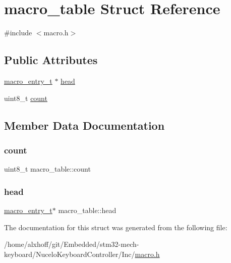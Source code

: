 \hypertarget{structmacro__table}{}\section{macro\+\_\+table Struct Reference}
\label{structmacro__table}


{\ttfamily \#include $<$macro.\+h$>$}

\subsection*{Public Attributes}
\begin{DoxyCompactItemize}
\item 
\hyperlink{macro_8h_af543547a5956dde30bf18b61541fba80}{macro\+\_\+entry\+\_\+t} $\ast$ \hyperlink{structmacro__table_a8609e9945fb75a90068f696b102ce28d}{head}
\item 
uint8\+\_\+t \hyperlink{structmacro__table_aa8c62e6878b8a406f6c8a8043127c65d}{count}
\end{DoxyCompactItemize}


\subsection{Member Data Documentation}
\mbox{\label{structmacro__table_aa8c62e6878b8a406f6c8a8043127c65d}} 
\subsubsection{\texorpdfstring{count}{count}}
{\footnotesize\ttfamily uint8\+\_\+t macro\+\_\+table\+::count}

\mbox{\label{structmacro__table_a8609e9945fb75a90068f696b102ce28d}} 
\subsubsection{\texorpdfstring{head}{head}}
{\footnotesize\ttfamily \hyperlink{macro_8h_af543547a5956dde30bf18b61541fba80}{macro\+\_\+entry\+\_\+t}$\ast$ macro\+\_\+table\+::head}



The documentation for this struct was generated from the following file\+:\begin{DoxyCompactItemize}
\item 
/home/alxhoff/git/\+Embedded/stm32-\/mech-\/keyboard/\+Nucelo\+Keyboard\+Controller/\+Inc/\hyperlink{macro_8h}{macro.\+h}\end{DoxyCompactItemize}
